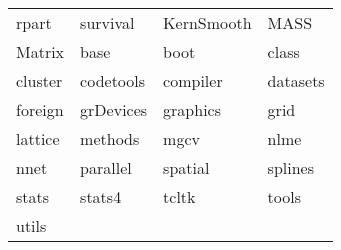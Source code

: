 \begin{tabular}{llll} 
rpart & survival & KernSmooth & MASS\\ 
Matrix & base & boot & class\\ 
cluster & codetools & compiler & datasets\\ 
foreign & grDevices & graphics & grid\\ 
lattice & methods & mgcv & nlme\\ 
nnet & parallel & spatial & splines\\ 
stats & stats4 & tcltk & tools\\ 
utils  &   &   \\ 
\end{tabular}
